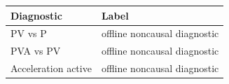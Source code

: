 \begin{tabular}{ll}
\hline
Diagnostic & Label \\
\hline
PV vs P & offline noncausal diagnostic \\
PVA vs PV & offline noncausal diagnostic \\
Acceleration active & offline noncausal diagnostic \\
\hline
\end{tabular}
